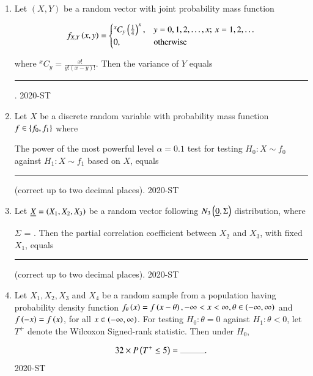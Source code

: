 \documentclass[journal,12pt,onecolumn]{IEEEtran}
\theoremstyle{remark}
\begin{document}
\begin{enumerate}
\item Let $ (X, Y) $ be a random vector with joint probability mass function

\begin{align*}
f_{X,Y}\left(x,y\right) = 
\begin{cases} 
{}^x C_y \left( \frac{1}{4} \right)^x, & y = 0, 1, 2, \ldots, x; \, x = 1, 2, \ldots \\
0, & \text{otherwise}
\end{cases}
\end{align*}

where $ {}^x C_y = \frac{x!}{y!(x - y)!} $. Then the variance of $ Y $ equals \rule{1cm}{0.2pt}.
\hfill{2020-ST}


\item Let $X$ be a discrete random variable with probability mass function $f \in \left\{f_0, f_1\right\}$ where
	\begin{table}[ht]
		\centering
		
	\end{table}
      The power of the most powerful level $\alpha = 0.1$ test for testing $
	H_0 : X \sim f_0$ against $H_1 : X \sim f_1$ based on $X$, equals \rule{1cm}{0.2pt} (correct up to two decimal places).
\hfill{2020-ST}


\item Let $ \underline{X} = \left(X_1, X_2, X_3\right) $ be a random vector following $ N_{3}\left(\underline{0}, \Sigma\right) $ distribution, where


$\Sigma$ = . Then the partial correlation coefficient between $ X_2 $ and $ X_3 $, with fixed $ X_1 $, equals \rule{1cm}{0.2pt} (correct up to two decimal places).
\hfill{2020-ST}


\item Let $ X_1, X_2, X_3 $ and $ X_4 $ be a random sample from a population having probability density function $ f_\theta\left(x\right) = f\left(x - \theta\right), -\infty < x < \infty, \theta \in \left(-\infty, \infty\right) $ and $ f\left(-x\right) = f\left(x\right) $, for all $ x \in \left(-\infty, \infty\right) $. For testing $ H_0 : \theta = 0 $ against $ H_1 : \theta < 0 $, let $ T^+ $ denote the Wilcoxon Signed-rank statistic. Then under $ H_0 $,

	\begin{align*}
		32 \times P\brak{T^+ \leq 5} = \rule{1cm}{0.2pt}.
	\end{align*}
\hfill{2020-ST}



\end{enumerate}
\end{document}
